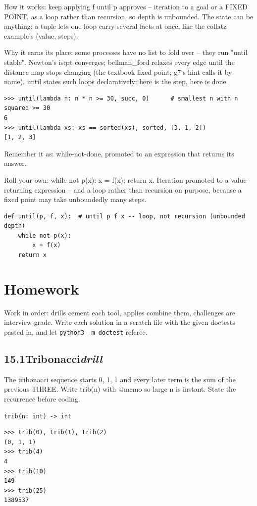 \documentclass[10pt,letterpaper]{book}
\begin{document}
How it works: keep applying f until p approves -- iteration to a goal or a FIXED POINT, as a loop rather than recursion, so depth is unbounded. The state can be anything; a tuple lets one loop carry several facts at once, like the collatz example's (value, steps).


Why it earns its place: some processes have no list to fold over -- they run "until stable". Newton's isqrt converges; bellman\_ford relaxes every edge until the distance map stops changing (the textbook fixed point; g7's hint calls it by name). until states such loops declaratively: here is the step, here is done.

\begin{lstlisting}[style=ex]
>>> until(lambda n: n * n >= 30, succ, 0)      # smallest n with n squared >= 30
6
>>> until(lambda xs: xs == sorted(xs), sorted, [3, 1, 2])
[1, 2, 3]
\end{lstlisting}

Remember it as: while-not-done, promoted to an expression that returns its answer.


Roll your own: while not p(x): x = f(x); return x. Iteration promoted to a value-returning expression -- and a loop rather than recursion on purpose, because a fixed point may take unboundedly many steps.

\begin{lstlisting}[style=ex]
def until(p, f, x):  # until p f x -- loop, not recursion (unbounded depth)
    while not p(x):
        x = f(x)
    return x
\end{lstlisting}
\section{Homework}
Work in order: drills cement each tool, applies combine them,
challenges are interview-grade. Write each solution in a scratch file with
the given doctests pasted in, and let \texttt{python3 -m doctest} referee.
\subsection*{15.1\quad Tribonacci\hfill\textnormal{\textit{drill}}}
The tribonacci sequence starts 0, 1, 1 and every later term is the sum of the previous THREE. Write trib(n) with @memo so large n is instant. State the recurrence before coding.

\noindent\texttt{trib(n: int) -> int}
\begin{lstlisting}[style=ex]
>>> trib(0), trib(1), trib(2)
(0, 1, 1)
>>> trib(4)
4
>>> trib(10)
149
>>> trib(25)
1389537
\end{lstlisting}
\end{document}
